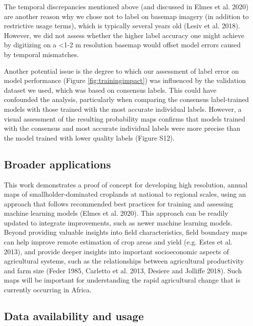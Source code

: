 \documentclass[11pt,a4paper]{article}
\begin{document}
The temporal discrepancies mentioned above (and discussed in Elmes et
al. 2020) are another reason why we chose not to label on basemap
imagery (in addition to restrictive usage terms), which is typically
several years old (Lesiv et al. 2018). However, we did not assess
whether the higher label accuracy one might achieve by digitizing on a
\textless1-2 m resolution basemap would offset model errors caused by
temporal mismatches.

Another potential issue is the degree to which our assessment of label
error on model performance (Figure \ref{fig:trainingimpact}) was
influenced by the validation dataset we used, which was based on
consensus labels. This could have confounded the analysis, particularly
when comparing the consensus label-trained models with those trained
with the most accurate individual labels. However, a visual assessment
of the resulting probability maps confirms that models trained with the
consensus and most accurate individual labels were more precise than the
model trained with lower quality labels (Figure S12).

\hypertarget{broader-applications}{%
\subsection{Broader applications}\label{broader-applications}}

This work demonstrates a proof of concept for developing high
resolution, annual maps of smallholder-dominated croplands at national
to regional scales, using an approach that follows recommended best
practices for training and assessing machine learning models (Elmes et
al. 2020). This approach can be readily updated to integrate
improvements, such as newer machine learning models. Beyond providing
valuable insights into field characteristics, field boundary maps can
help improve remote estimation of crop areas and yield (e.g. Estes et
al. 2013), and provide deeper insights into important socioeconomic
aspects of agricultural systems, such as the relationships between
agricultural productivity and farm size (Feder 1985, Carletto et al.
2013, Desiere and Jolliffe 2018). Such maps will be important for
understanding the rapid agricultural change that is currently occurring
in Africa.

\hypertarget{data-availability-and-usage}{%
\subsection{Data availability and
usage}\label{data-availability-and-usage}}
\end{document}
